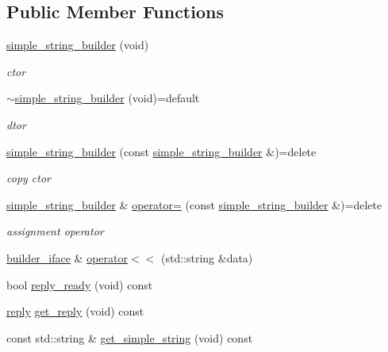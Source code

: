 \subsection*{Public Member Functions}
\begin{DoxyCompactItemize}
\item 
\hyperlink{classcpp__redis_1_1builders_1_1simple__string__builder_a51fcb7777a78cbd3599aae8896e4d06a}{simple\+\_\+string\+\_\+builder} (void)
\begin{DoxyCompactList}\small\item\em ctor \end{DoxyCompactList}\item 
\hyperlink{classcpp__redis_1_1builders_1_1simple__string__builder_a7b4f012c532535801f9d5fddbb01d675}{$\sim$simple\+\_\+string\+\_\+builder} (void)=default
\begin{DoxyCompactList}\small\item\em dtor \end{DoxyCompactList}\item 
\hyperlink{classcpp__redis_1_1builders_1_1simple__string__builder_a0a17d659e654ee1190c635d3b3093235}{simple\+\_\+string\+\_\+builder} (const \hyperlink{classcpp__redis_1_1builders_1_1simple__string__builder}{simple\+\_\+string\+\_\+builder} \&)=delete
\begin{DoxyCompactList}\small\item\em copy ctor \end{DoxyCompactList}\item 
\hyperlink{classcpp__redis_1_1builders_1_1simple__string__builder}{simple\+\_\+string\+\_\+builder} \& \hyperlink{classcpp__redis_1_1builders_1_1simple__string__builder_afc86dd3148ef0094d08b4282f7cb597d}{operator=} (const \hyperlink{classcpp__redis_1_1builders_1_1simple__string__builder}{simple\+\_\+string\+\_\+builder} \&)=delete
\begin{DoxyCompactList}\small\item\em assignment operator \end{DoxyCompactList}\item 
\hyperlink{classcpp__redis_1_1builders_1_1builder__iface}{builder\+\_\+iface} \& \hyperlink{classcpp__redis_1_1builders_1_1simple__string__builder_a159bb512f0427c4a988742f7cd01035e}{operator$<$$<$} (std\+::string \&data)
\item 
bool \hyperlink{classcpp__redis_1_1builders_1_1simple__string__builder_ad586164caf02b3022b91789cac23a72d}{reply\+\_\+ready} (void) const
\item 
\hyperlink{classcpp__redis_1_1reply}{reply} \hyperlink{classcpp__redis_1_1builders_1_1simple__string__builder_a24ad0968d7d02172a65cf8982c540d51}{get\+\_\+reply} (void) const
\item 
const std\+::string \& \hyperlink{classcpp__redis_1_1builders_1_1simple__string__builder_a539ba8a9234269e57471f1973adc58c2}{get\+\_\+simple\+\_\+string} (void) const
\end{DoxyCompactItemize}
